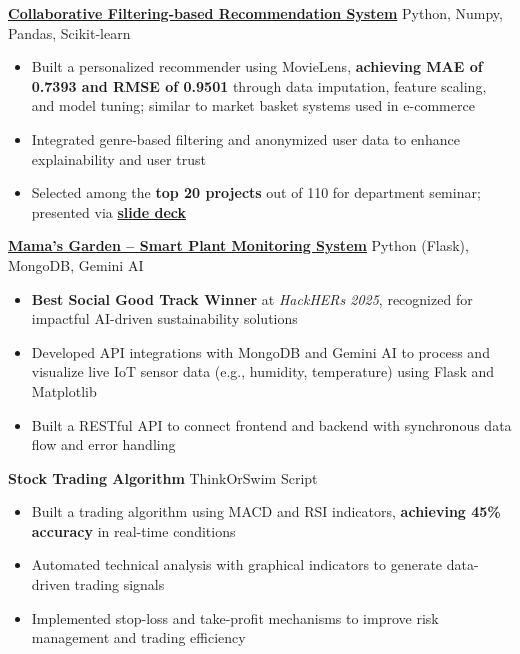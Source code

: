 \documentclass[a4paper]{article}
\begin{document}
\textbf{\href{https://github.com/ShatakshiRanjan/Recommendation-systems}{Collaborative Filtering-based Recommendation System}} \hfill Python, Numpy, Pandas, Scikit-learn
\vspace{-2.5mm}
\begin{itemize} \itemsep -4pt
\item Built a personalized recommender using MovieLens, \textbf{achieving MAE of 0.7393 and RMSE of 0.9501} through data imputation, feature scaling, and model tuning; similar to market basket systems used in e-commerce
\item Integrated genre-based filtering and anonymized user data to enhance explainability and user trust
\item Selected among the \textbf{top 20 projects} out of 110 for department seminar; presented via \textbf{\href{https://docs.google.com/presentation/d/1r65Cy6-eKkuGI6xonAQxm5vqnZ0_YV5kaQh9pkjvJF0/edit?usp=sharing}{slide deck}}
\end{itemize}
\vspace{-1mm}

\textbf{\href{https://devpost.com/software/mama-s-garden}{Mama's Garden – Smart Plant Monitoring System}} \hfill Python (Flask), MongoDB, Gemini AI  
\vspace{-3mm}
\begin{itemize} \itemsep -4pt
    \item \textbf{Best Social Good Track Winner} at \textit{HackHERs 2025}, recognized for impactful AI-driven sustainability solutions
    \item Developed API integrations with MongoDB and Gemini AI to process and visualize live IoT sensor data (e.g., humidity, temperature) using Flask and Matplotlib
    \item Built a RESTful API to connect frontend and backend with synchronous data flow and error handling
\end{itemize}
\vspace{-1mm}

\textbf{{Stock Trading Algorithm}}  \hfill ThinkOrSwim Script \\
\vspace{-3mm}
\begin{itemize} \itemsep -4pt
  \item Built a trading algorithm using MACD and RSI indicators, \textbf{achieving 45\% accuracy} in real-time conditions
  \item Automated technical analysis with graphical indicators to generate data-driven trading signals
  \item Implemented stop-loss and take-profit mechanisms to improve risk management and trading efficiency
\end{itemize}
\vspace{-2mm}
\end{document}
